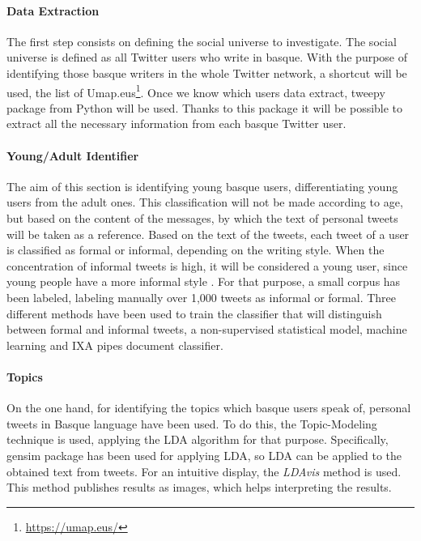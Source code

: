 \documentclass[information,article,submit,moreauthors,pdftex,10pt,a4paper]{Definitions/mdpi}
\begin{document}
\paragraph{Data Extraction}

The first step consists on defining the social universe to investigate. The social universe is defined as all Twitter users who write in basque. With the purpose of identifying those basque writers in the whole Twitter network, a shortcut will be used, the list of Umap.eus\footnote{\url{https://umap.eus/}}. Once we know which users data extract, tweepy \citep{roesslein2009tweepy} package from Python will be used. Thanks to this package it will be possible to extract all the necessary information from each basque Twitter user.

\paragraph{Young/Adult Identifier}

The aim of this section is identifying young basque users, differentiating young users from the adult ones. This classification will not be made according to age, but based on the content of the messages, by which the text of personal tweets will be taken as a reference. Based on the text of the tweets, each tweet of a user is classified as formal or informal, depending on the writing style. When the concentration of informal tweets is high, it will be considered a young user, since young people have a more informal style \citep{nguyen2013old}. For that purpose, a small corpus has been labeled, labeling manually over 1,000 tweets as informal or formal. Three different methods have been used to train the classifier that will distinguish between formal and informal tweets, a non-supervised statistical model, machine learning and IXA pipes document classifier.

\paragraph{Topics}

On the one hand, for identifying the topics which basque users speak of, personal tweets in Basque language have been used. To do this, the Topic-Modeling technique is used, applying the LDA algorithm for that purpose. Specifically, gensim \citep{rehurek2010software} package has been used for applying LDA, so LDA can be applied to the obtained text from tweets. For an intuitive display, the \textit{LDAvis} method \citep{sievert2014ldavis} is used. This method publishes results as images, which helps interpreting the results.
\end{document}
